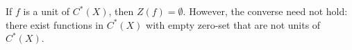 If $f$ is a unit of $C^*(X)$, then $Z(f) = \emptyset$. However, the converse need not hold: there exist functions in $C^*(X)$ with empty zero-set that are not units of $C^*(X)$.
